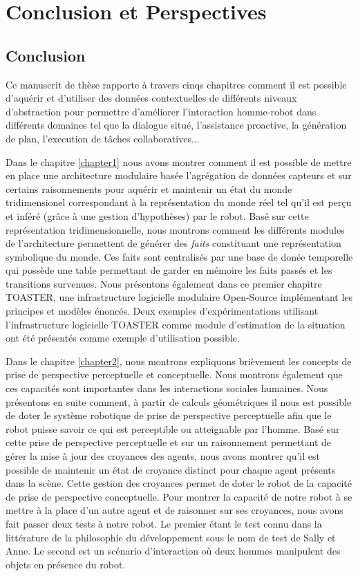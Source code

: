 \documentclass[a4paper,11pt,twoside]{StyleThese}
\begin{document}
\fi


\chapter*{Conclusion et Perspectives}

\section{Conclusion}
Ce manuscrit de thèse rapporte à travers cinqs chapitres comment il est possible d'aquérir et d'utiliser des données contextuelles de différents niveaux d'abstraction pour permettre d'améliorer l'interaction homme-robot dans différents domaines tel que la dialogue situé, l'assistance proactive, la génération de plan, l'execution de tâches collaboratives...

Dans le chapitre \ref{chapter1} nous avons montrer comment il est possible de mettre en place une architecture modulaire basée l'agrégation de données capteurs et sur certains raisonnements pour aquérir et maintenir un état du monde tridimensionel correspondant à la représentation du monde réel tel qu'il est perçu et inféré (grâce à une gestion d'hypothèses) par le robot. Basé sur cette représentation tridimensionnelle, nous montrons comment les différents modules de l'architecture permettent de générer des \textit{faits} constituant une représentation symbolique du monde. Ces faits sont centralisés par une base de donée temporelle qui possède une table permettant de garder en mémoire les faits passés et les transitions survenues. Nous présentons également dans ce premier chapitre TOASTER, une infrastructure logicielle modulaire Open-Source implémentant les principes et modèles énoncés.
Deux exemples d'expérimentations utilisant l'infrastructure logicielle TOASTER comme module d'estimation de la situation ont été présentés comme exemple d'utilisation possible.

Dans le chapitre \ref{chapter2}, nous montrons expliquons brièvement les concepts de prise de perspective perceptuelle et conceptuelle. Nous montrons également que ces capacités sont importantes dans les interactions sociales humaines. Nous présentons en suite comment, à partir de calculs géométriques il nous est possible de doter le système robotique de prise de perspective perceptuelle afin que le robot puisse savoir ce qui est perceptible ou atteignable par l'homme.
Basé sur cette prise de perspective perceptuelle et sur un raisonnement permettant de gérer la mise à jour des croyances des agents, nous avons montrer qu'il est possible de maintenir un état de croyance distinct pour chaque agent présents dans la scène. Cette gestion des croyances permet de doter le robot de la capacité de prise de perspective conceptuelle.
Pour montrer la capacité de notre robot à se mettre à la place d'un autre agent et de raisonner sur ses croyances, nous avons fait passer deux tests à notre robot. Le premier étant le test connu dans la littérature de la philosophie du développement sous le nom de test de Sally et Anne. Le second est un scénario d'interaction où deux hommes manipulent des objets en présence du robot.
\end{document}
